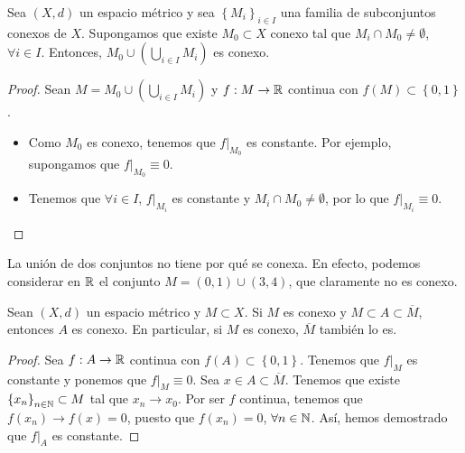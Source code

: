 \begin{lema}
	Sea $\displaystyle \left(X,d\right) $ un espacio métrico y sea $\displaystyle \left\{ M_{i}\right\} _{i\in I} $ una familia de subconjuntos conexos de $\displaystyle X $. Supongamos que existe $\displaystyle M_{0} \subset X $ conexo tal que $\displaystyle M_{i} \cap M_{0} \neq \emptyset $, $\displaystyle \forall i \in I $. Entonces, $\displaystyle M_{0} \cup \left(\bigcup_{i \in I}M_{i}\right) $ es conexo.
\end{lema}
\begin{proof}
	Sean $\displaystyle M = M_{0} \cup \left(\bigcup_{ i \in I}M_{i}\right) $ y $\displaystyle f : M \to \mathbb{R} $ continua con $\displaystyle f\left(M\right) \subset \left\{ 0,1\right\}  $. 
	\begin{itemize}
	\item Como $\displaystyle M_{0} $ es conexo, tenemos que $\displaystyle f|_{M_{0}} $ es constante. Por ejemplo, supongamos que $\displaystyle f|_{M_{0}} \equiv 0 $. 
	\item Tenemos que $\displaystyle \forall i \in I $, $\displaystyle f|_{M_{i}} $ es constante y $\displaystyle M_{i} \cap M_{0} \neq \emptyset $, por lo que $\displaystyle f|_{M_{i}} \equiv 0 $.
	\end{itemize}
\end{proof}
\begin{observation}
La unión de dos conjuntos no tiene por qué se conexa. En efecto, podemos considerar en $\displaystyle \mathbb{R} $ el conjunto $\displaystyle M = \left(0,1\right) \cup \left(3,4\right) $, que claramente no es conexo.
\end{observation}
\begin{theorem}
Sean $\displaystyle \left(X,d\right) $ un espacio métrico y $\displaystyle M \subset X $. Si $\displaystyle M $ es conexo y $\displaystyle M \subset A \subset \overline{M} $, entonces $\displaystyle A $ es conexo. En particular, si $\displaystyle M $ es conexo, $\displaystyle \overline{M} $ también lo es.
\end{theorem}
\begin{proof}
	Sea $\displaystyle f:A \to \mathbb{R} $ continua con $\displaystyle f\left(A\right) \subset \left\{ 0,1\right\}  $. Tenemos que $\displaystyle f|_{M} $ es constante y ponemos que $\displaystyle f|_{M}\equiv 0 $. Sea $\displaystyle x \in A \subset \overline{M} $. Tenemos que existe $\displaystyle \left\{ x_{n}\right\} _{n\in\mathbb{N}}\subset M $ tal que $\displaystyle x_{n} \to x_{0} $.
Por ser $\displaystyle f $ continua, tenemos que $\displaystyle f\left(x_{n}\right)\to f\left(x\right) = 0 $, puesto que $\displaystyle f\left(x_{n}\right) = 0 $, $\displaystyle \forall n \in \mathbb{N} $. Así, hemos demostrado que $\displaystyle f|_{A} $ es constante.
\end{proof}
